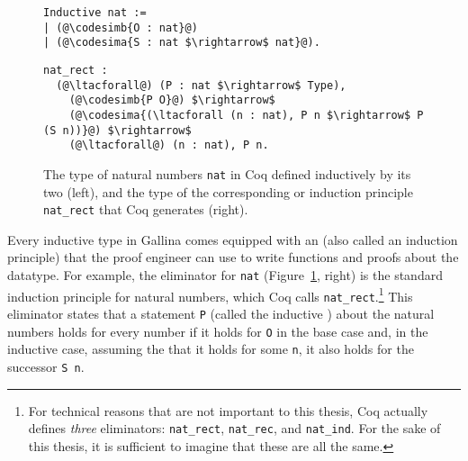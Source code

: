 \begin{figure}
\begin{minipage}{0.30\textwidth}
\begin{lstlisting}
Inductive nat :=
| (@\codesimb{O : nat}@)
| (@\codesima{S : nat $\rightarrow$ nat}@).
\end{lstlisting}
\end{minipage}
\hfill
\begin{minipage}{0.68\textwidth}
\begin{lstlisting}
nat_rect :
  (@\ltacforall@) (P : nat $\rightarrow$ Type),
    (@\codesimb{P O}@) $\rightarrow$
    (@\codesima{(\ltacforall (n : nat), P n $\rightarrow$ P (S n))}@) $\rightarrow$
    (@\ltacforall@) (n : nat), P n.
\end{lstlisting}
\end{minipage}
\caption{The type of natural numbers \lstinline{nat} in Coq defined inductively by its two  (left), and the type of the corresponding  or induction principle \lstinline{nat_rect} that Coq generates (right).}
\label{fig:nat}
\end{figure}

Every inductive type in Gallina comes equipped with an  (also called an induction principle)
that the proof engineer can use to write functions and proofs about the datatype.
For example, the eliminator for \lstinline{nat} (Figure~\ref{fig:nat}, right) is the standard induction principle for natural numbers,
which Coq calls \lstinline{nat_rect}.\footnote{For technical reasons that are not important to this thesis,
Coq actually defines \textit{three} eliminators: \lstinline{nat_rect}, \lstinline{nat_rec}, and \lstinline{nat_ind}.
For the sake of this thesis, it is sufficient to imagine that these are all the same.}
This eliminator states that a statement \lstinline{P} (called the inductive ) about the natural numbers
holds for every number if it holds for \lstinline{O} in the base case and, in the inductive case,
assuming the  that it holds for some \lstinline{n}, it also holds for the successor \lstinline{S n}.

